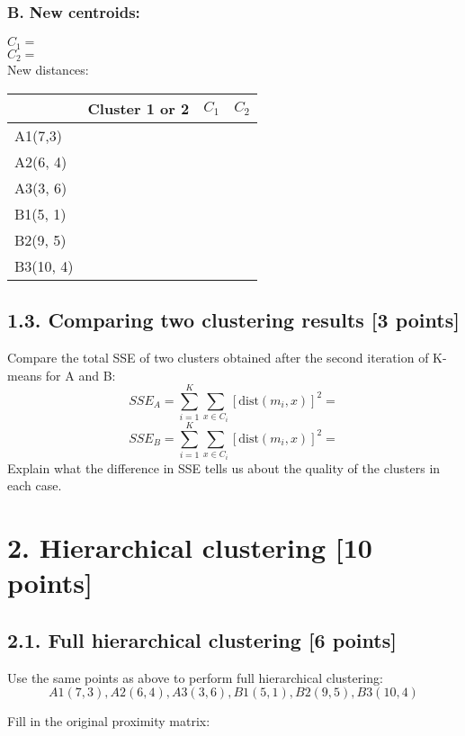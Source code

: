 \documentclass{article}
\begin{document}
\subsubsection*{B. New centroids:}
$C_1=$ \\
$C_2=$ \\
New distances:

\begin{table}[h]
\label{T12B}
\begin{tabular}{|l|l|l|l|}
\hline
          & Cluster 1 or 2 & $C_1$ & $C_2$ \\ \hline
A1(7,3)   &                &  &  \\ \hline
A2(6, 4)  &                &  &  \\ \hline
A3(3, 6)  &                &  &  \\ \hline
B1(5, 1)  &                &  &  \\ \hline
B2(9, 5)  &                &  &  \\ \hline
B3(10, 4) &                &  &  \\ \hline
\end{tabular}
\end{table}
\label{T12B}

\subsection*{1.3. Comparing two clustering results [3 points]}
Compare the total SSE of two clusters obtained after the second iteration of K-means for A and B:
\[
SSE_A = \sum_{i=1}^{K} \sum_{x \in C_i} \left[ \text{dist}(m_i, x) \right]^2=
\]
\[
SSE_B = \sum_{i=1}^{K} \sum_{x \in C_i} \left[ \text{dist}(m_i, x) \right]^2=
\]
Explain what the difference in SSE tells us about the quality of the clusters in each case.

\newpage
\section*{2. Hierarchical clustering [10 points]} 
\subsection*{2.1. Full hierarchical clustering [6 points]}
Use the same points as above to perform full hierarchical clustering:
\[ A1(7,3), A2(6,4), A3(3,6), B1(5,1), B2(9,5), B3(10,4) \]

Fill in the original proximity matrix:
\end{document}
